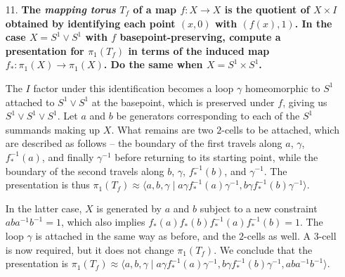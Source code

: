 \documentclass[a4paper,12pt]{article}
\newcommand{\iso}{\approx}
\begin{document}
\begin{enumerate}
    \item[11.]
        \boldmath\textbf{The \emph{mapping torus} $T_f$ of a map $f : X \to X$ is the quotient of $X \times I$ obtained by identifying each point $(x, 0)$ with $(f(x), 1)$. In the case $X = S^1 \lor S^1$ with $f$ basepoint-preserving, compute a presentation for $\pi_1(T_f)$ in terms of the induced map $f_* : \pi_1(X) \to \pi_1(X)$. Do the same when $X = S^1 \times S^1$.
        }\unboldmath \par
        The $I$ factor under this identification becomes a loop $\gamma$ homeomorphic to $S^1$ attached to $S^1 \lor S^1$ at the basepoint, which is preserved under $f$, giving us $S^1 \lor S^1 \lor S^1$. Let $a$ and $b$ be generators corresponding to each of the $S^1$ summands making up $X$. What remains are two $2$-cells to be attached, which are described as follows -- the boundary of the first travels along $a$, $\gamma$, $f_*^{-1}(a)$, and finally $\gamma^{-1}$ before returning to its starting point, while the boundary of the second travels along $b$, $\gamma$, $f_*^{-1}(b)$, and $\gamma^{-1}$. The presentation is thus $\pi_1(T_f) \iso \langle a, b, \gamma \mid a \gamma f_*^{-1}(a) \gamma^{-1}, b \gamma f_*^{-1}(b) \gamma^{-1} \rangle$. \par
        \sloppy
        In the latter case, $X$ is generated by $a$ and $b$ subject to a new constraint $aba^{-1}b^{-1} = 1$, which also implies $f_*(a) f_*(b) f_*^{-1}(a) f_*^{-1}(b) = 1$. The loop $\gamma$ is attached in the same way as before, and the $2$-cells as well. A $3$-cell is now required, but it does not change $\pi_1(T_f)$. We conclude that the presentation is $\pi_1(T_f) \iso \langle a, b, \gamma \mid a \gamma f_*^{-1}(a) \gamma^{-1}, b \gamma f_*^{-1}(b) \gamma^{-1}, aba^{-1}b^{-1} \rangle$.


\end{enumerate}
\end{document}
